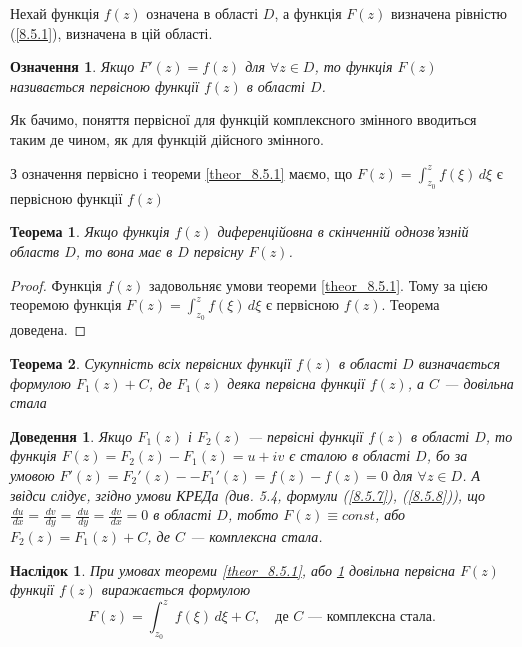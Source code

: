 \documentclass[12pt,fleqn]{article}
\theoremstyle{theorem}
\newtheorem{thm}{Теорема}[section]
\newtheorem{ozn}{Означення}[section]
\theoremstyle{proof}
\newtheorem*{dov}{Доведення}
\newtheorem{corollary}{Наслідок}[section]
\numberwithin{figure}{section}
\numberwithin{equation}{section}
\begin{document}
Нехай функція $f(z)$ означена в області $D$, а функція $F(z)$ визначена рівністю (\ref{8.5.1}),  визначена в цій області.

\begin{ozn}
Якщо $F'(z)=f(z)$ для $\forall z\in D$, то функція $F(z)$ називається первісною функції $f(z)$ в області $D$.
\end{ozn}

Як бачимо, поняття первісної для функцій комплексного змінного вводиться таким де чином, як для функцій дійсного змінного.

З означення первісно і теореми \ref{theor_8.5.1} маємо, що $F(z)= \int_{z_0}^{z} f(\xi) \,d\xi$ є первісною функції $f(z)$

\begin{thm}\label{theor_8.5.2}
Якщо функція $f(z)$ диференційовна в скінченній однозв'язній областв $D$, то вона має в $D$ первісну $F(z)$.
\end{thm}

\begin{proof}
Функція $f(z)$ задовольняє умови теореми \ref{theor_8.5.1}. Тому за цією теоремою функція $F(z)= \int_{z_0}^{z} f(\xi) \,d\xi$ є первісною $f(z)$. Теорема доведена.
\end{proof}

\begin{thm}\label{theor_8.5.3}
Сукупність всіх первісних функції $f(z)$ в області $D$ визначається формулою $F_1(z)+C$, де $F_1(z)$ деяка первісна функції $f(z)$, а $C$ --- довільна стала
\end{thm}

\begin{dov}
Якщо $F_1(z)$ і $F_2(z)$ --- первісні функції $f(z)$ в області $D$, то функція $F(z)=F_2(z)-F_1(z)=u+iv$ є сталою в області $D$, бо за умовою $F'(z)=F_2'(z)- -F_1'(z)=f(z)-f(z)=0$ для $\forall z \in D$. А звідси слідує, згідно умови \emph{КРЕДа} (див. 5.4, формули (\ref{8.5.7}), (\ref{8.5.8})), що $\frac{\,du}{\,dx}=\frac{\,dv}{\,dy}=\frac{\,du}{\,dy}=\frac{\,dv}{\,dx}=0$ в області $D$, тобто $F(z)\equiv const$, або $F_2(z)=F_1(z)+C$, де $C$ --- комплексна стала.
\end{dov}

\begin{corollary}\label{corollary_8.5.1}
При умовах теореми \ref{theor_8.5.1}, або \ref{theor_8.5.2} довільна первісна $F(z)$ функції $f(z)$ виражається формулою
\begin{equation}\label{8.5.6}
F(z)= \int_{z_0}^{z}f(\xi)\,d\xi + C, \quad \text{де $C$ --- комплексна стала.}
\end{equation}
\end{corollary}
\end{document}

